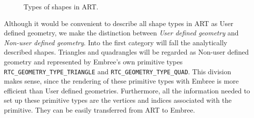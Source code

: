 \begin{figure}[!tbp]
	\centering
	\hfill
	\hfill
	\caption{Types of shapes in ART.}
	\label{fig:shape_types}
\end{figure}

Although it would be convenient to describe all shape types in ART as User defined geometry, we make the distinction between \emph{User defined geometry} and \emph{Non-user defined geometry}. Into the first category will fall the analytically described shapes. Triangles and quadrangles will be regarded as Non-user defined geometry and represented by Embree's own primitive types \texttt{RTC\_GEOMETRY\_TYPE\_TRIANGLE} and \texttt{RTC\_GEOMETRY\_TYPE\_QUAD}. This division makes sense, since the rendering of these primitive types with Embree is more efficient than User defined geometries. Furthermore, all the information needed to set up these primitive types are the vertices and indices associated with the primitive. They can be easily transferred from ART to Embree. 


